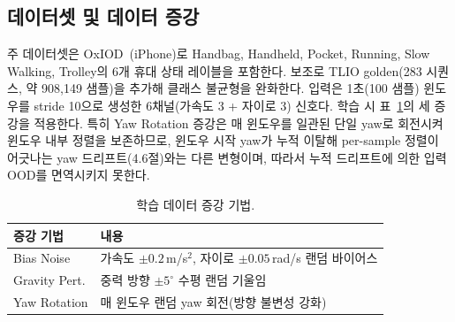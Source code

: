 \documentclass[10pt,twocolumn,a4paper]{article}
\begin{document}
\subsection{데이터셋 및 데이터 증강}
주 데이터셋은 OxIOD~\cite{oxiod}(iPhone)로 Handbag, Handheld, Pocket, Running, Slow Walking, Trolley의 6개 휴대 상태 레이블을 포함한다. 보조로 TLIO golden(283 시퀀스, 약 908{,}149 샘플)을 추가해 클래스 불균형을 완화한다. 입력은 1초(100 샘플) 윈도우를 stride 10으로 생성한 6채널(가속도 3 + 자이로 3) 신호다. 학습 시 표~\ref{tab:aug}의 세 증강을 적용한다. 특히 Yaw Rotation 증강은 매 윈도우를 일관된 단일 yaw로 회전시켜 윈도우 내부 정렬을 보존하므로, 윈도우 시작 yaw가 누적 이탈해 per-sample 정렬이 어긋나는 yaw 드리프트(4.6절)와는 다른 변형이며, 따라서 누적 드리프트에 의한 입력 OOD를 면역시키지 못한다.

\begin{table}[t]
\caption{학습 데이터 증강 기법.}
\label{tab:aug}
\centering\footnotesize
\begin{tabular}{@{}p{}p{}@{}}
\toprule
증강 기법 & 내용 \\ \midrule
Bias Noise & 가속도 $\pm0.2$\,m/s$^2$, 자이로 $\pm0.05$\,rad/s 랜덤 바이어스 \\
Gravity Pert. & 중력 방향 $\pm5^\circ$ 수평 랜덤 기울임 \\
Yaw Rotation & 매 윈도우 랜덤 yaw 회전(방향 불변성 강화) \\ \bottomrule
\end{tabular}
\end{table}
\end{document}
